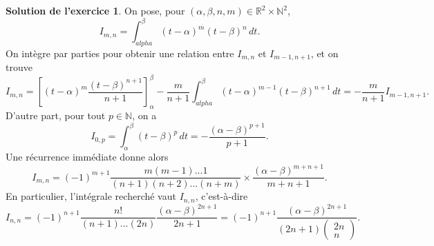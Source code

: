 \documentclass[a4paper, 11pt,openany]{article}%
\theoremstyle{plain}
\theoremstyle{definition}
\newtheorem{exo}{Exercice}
\newtheorem{sol}{Solution de l'exercice}
\theoremstyle{remark}
\newcommand{\R}{\mathbb{R}}
\newcommand{\N}{\mathbb{N}}
\begin{document}

\begin{sol}
On pose, pour $(\alpha,\beta,n,m) \in \R^2 \times \N^2$, 
\[ I_{m,n}= \int_{alpha}^{\beta} (t-\alpha)^m(t-\beta)^n \,dt.\]
On intègre par parties pour obtenir une relation entre $I_{m,n}$ et $I_{m-1,n+1}$, et on trouve 
\[ I_{m,n}= \left[ (t-\alpha)^m \frac{(t-\beta)^{n+1}}{n+1} \right]_{\alpha}^{\beta} - \frac{m}{n+1} \int_{alpha}^{\beta} (t-\alpha)^{m-1} (t-\beta)^{n+1} \,dt = -\frac{m}{n+1} I_{m-1,n+1}.\]
D'autre part, pour tout $p \in \N$, on a \[ I_{0,p} = \int_{\alpha}^{\beta} (t-\beta)^p \, dt= -\frac{(\alpha- \beta)^{p+1}}{p+1}.\]
Une récurrence immédiate donne alors \[ I_{m,n} = (-1)^{m+1} \frac{m(m-1)...1}{(n+1)(n+2)...(n+m)} \times \frac{(\alpha - \beta)^{m+n+1}}{m+n+1}.\]
En particulier, l'intégrale recherché vaut $I_{n,n}$, c'est-à-dire 
\[I_{n,n}=(-1)^{n+1}\frac{n!}{(n+1)...(2n)}\frac{(\alpha-\beta)^{2n+1}}{2n+1} = (-1)^{n+1}\frac{(\alpha-\beta)^{2n+1}}{(2n+1) \begin{pmatrix}
2n \\ n
\end{pmatrix}}.\]
\end{sol}
   




\end{document}
